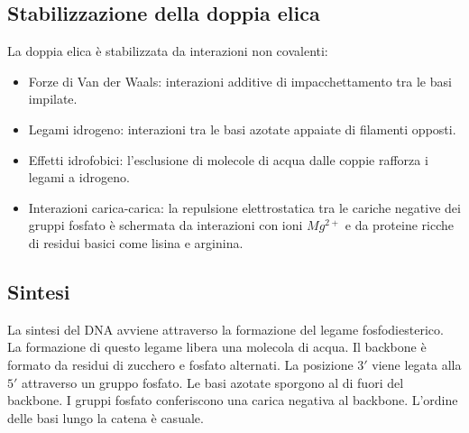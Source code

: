 	\subsection{Stabilizzazione della doppia elica}
	La doppia elica \`e stabilizzata da interazioni non covalenti:
	\begin{multicols}{2}
		\begin{itemize}
			\item Forze di Van der Waals: interazioni additive di impacchettamento tra le basi impilate.
			\item Legami idrogeno: interazioni tra le basi azotate appaiate di filamenti opposti.
			\item Effetti idrofobici: l'esclusione di molecole di acqua dalle coppie rafforza i legami a idrogeno.
			\item Interazioni carica-carica: la repulsione elettrostatica tra le cariche negative dei gruppi fosfato \`e schermata da interazioni con ioni \emph{$Mg^{2+}$} e da proteine ricche di residui basici come lisina e arginina.
		\end{itemize}
	\end{multicols}

	\subsection{Sintesi}
	La sintesi del DNA avviene attraverso la formazione del legame fosfodiesterico.
	La formazione di questo legame libera una molecola di acqua.
	Il backbone \`e formato da residui di zucchero e fosfato alternati.
	La posizione $3'$ viene legata alla $5'$ attraverso un gruppo fosfato.
	Le basi azotate sporgono al di fuori del backbone.
	I gruppi fosfato conferiscono una carica negativa al backbone.
	L'ordine delle basi lungo la catena \`e casuale.


